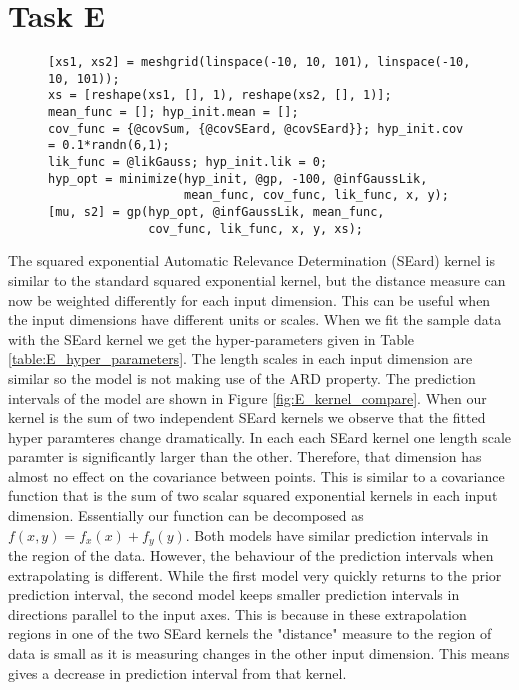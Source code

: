 \documentclass[11pt]{article}
\begin{document}
\section{Task E}

\begin{figure}[h]
\begin{lstlisting}[caption=Code to train and calculate prediction intervals of a 2D GP with SE ARD kernel, captionpos=b, basicstyle=\small, frame=tlrb]
[xs1, xs2] = meshgrid(linspace(-10, 10, 101), linspace(-10, 10, 101));
xs = [reshape(xs1, [], 1), reshape(xs2, [], 1)];
mean_func = []; hyp_init.mean = [];
cov_func = {@covSum, {@covSEard, @covSEard}}; hyp_init.cov = 0.1*randn(6,1);
lik_func = @likGauss; hyp_init.lik = 0;
hyp_opt = minimize(hyp_init, @gp, -100, @infGaussLik, 
                   mean_func, cov_func, lik_func, x, y);
[mu, s2] = gp(hyp_opt, @infGaussLik, mean_func, 
              cov_func, lik_func, x, y, xs);
\end{lstlisting}
\label{lst:E}
\end{figure}

The squared exponential Automatic Relevance Determination (SEard) kernel is similar to the standard squared exponential kernel, but the distance measure can now be weighted differently for each input dimension. This can be useful when the input dimensions have different units or scales. When we fit the sample data with the SEard kernel we get the hyper-parameters given in Table \ref{table:E_hyper_parameters}. The length scales in each input dimension are similar so the model is not making use of the ARD property. The prediction intervals of the model are shown in Figure \ref{fig:E_kernel_compare}. When our kernel is the sum of two independent SEard kernels we observe that the fitted hyper paramteres change dramatically. In each each SEard kernel one length scale paramter is significantly larger than the other. Therefore, that dimension has almost no effect on the covariance between points. This is similar to a covariance function that is the sum of two scalar squared exponential kernels in each input dimension. Essentially our function can be decomposed as $f(x,y) = f_x(x) + f_y(y)$. Both models have similar prediction intervals in the region of the data. However, the behaviour of the prediction intervals when extrapolating is different. While the first model very quickly returns to the prior prediction interval, the second model keeps smaller prediction intervals in directions parallel to the input axes. This is because in these extrapolation regions in one of the two SEard kernels the "distance" measure to the region of data is small as it is measuring changes in the other input dimension. This means gives a decrease in prediction interval from that kernel. 
\end{document}
